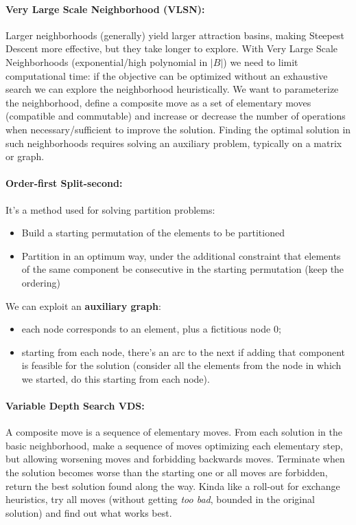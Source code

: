 \documentclass{article}
\begin{document}
	\paragraph{Very Large Scale Neighborhood (VLSN):} Larger neighborhoods (generally) yield larger attraction basins, making Steepest Descent more effective, but they take longer to explore. With Very Large Scale Neighborhoods (exponential/high polynomial in $|B|$) we need to limit computational time: if the objective can be optimized without an exhaustive search we can explore the neighborhood heuristically. We want to parameterize the neighborhood, define a composite move as a set of elementary moves (compatible and commutable) and increase or decrease the number of operations when necessary/sufficient to improve the solution. Finding the optimal solution in such neighborhoods requires solving an auxiliary problem, typically on a matrix or graph.\\
	
	\paragraph{Order-first Split-second:} It's a method used for solving partition problems:
	\begin{itemize}
		\item Build a starting permutation of the elements to be partitioned
		\item Partition in an optimum way, under the additional constraint that elements of the same component be consecutive in the starting permutation (keep the ordering)
	\end{itemize}
	We can exploit an \textbf{auxiliary graph}: 
	\begin{itemize}
		\item each node corresponds to an element, plus a fictitious node $0$;
		\item starting from each node, there's an arc to the next if adding that component is feasible for the solution (consider all the elements from the node in which we started, do this starting from each node).\\
	\end{itemize}
	
	\paragraph{Variable Depth Search VDS:} A composite move is a sequence of elementary moves. From each solution in the basic neighborhood, make a sequence of moves optimizing each elementary step, but allowing worsening moves and forbidding backwards moves. Terminate when the solution becomes worse than the starting one or all moves are forbidden, return the best solution found along the way. Kinda like a roll-out for exchange heuristics, try all moves (without getting \textit{too bad}, bounded in the original solution) and find out what works best.\\
	
\end{document}
